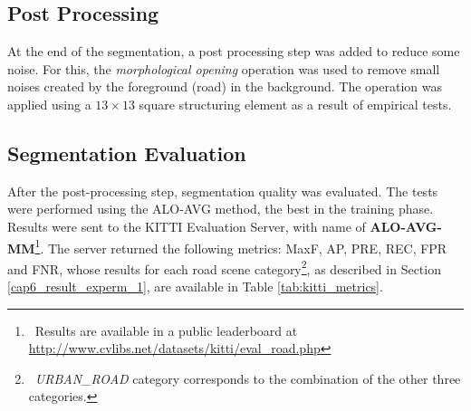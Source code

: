\subsection{Post Processing}
\label{cap6_pos_processamento}

At the end of the segmentation, a post processing step was added to reduce some noise.
For this, the \textit{morphological opening} operation was used to remove small noises created by the foreground (road) in the background.
The operation was applied using a $13 \times 13$ square structuring element as a result of empirical tests.

% 

\subsection{Segmentation Evaluation}
\label{cap6_resultados_segmentacao}

After the post-processing step, segmentation quality was evaluated.
The tests were performed using the ALO-AVG method, the best in the training phase.
Results were sent to  the KITTI Evaluation Server, with name of \textbf{ALO-AVG-MM}\footnote{~Results are available in a public leaderboard at \url{http://www.cvlibs.net/datasets/kitti/eval_road.php}}.
The server returned the following metrics: MaxF, AP, PRE, REC, FPR and FNR, whose results for each road scene category\footnote{~\textit{URBAN\_ROAD} category corresponds to the combination of the other three categories.}, as described in Section \ref{cap6_result_experm_1}, are available in Table \ref{tab:kitti_metrics}.



